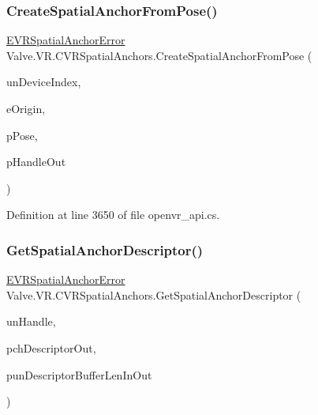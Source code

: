 \subsubsection{\texorpdfstring{CreateSpatialAnchorFromPose()}{CreateSpatialAnchorFromPose()}}
{\footnotesize\ttfamily \mbox{\hyperlink{namespace_valve_1_1_v_r_ab0aeb9b02c0851286deb0b4134b220d4}{E\+V\+R\+Spatial\+Anchor\+Error}} Valve.\+V\+R.\+C\+V\+R\+Spatial\+Anchors.\+Create\+Spatial\+Anchor\+From\+Pose (\begin{DoxyParamCaption}\item[{uint}]{un\+Device\+Index,  }\item[{\mbox{\hyperlink{namespace_valve_1_1_v_r_a29be99a3c2f780157bd490db06a7f12f}{E\+Tracking\+Universe\+Origin}}}]{e\+Origin,  }\item[{ref \mbox{\hyperlink{struct_valve_1_1_v_r_1_1_spatial_anchor_pose__t}{Spatial\+Anchor\+Pose\+\_\+t}}}]{p\+Pose,  }\item[{ref uint}]{p\+Handle\+Out }\end{DoxyParamCaption})}



Definition at line 3650 of file openvr\+\_\+api.\+cs.

\mbox{\label{class_valve_1_1_v_r_1_1_c_v_r_spatial_anchors_af010b477e2a6eb63b4a4c2a4258f3e87}} 
\subsubsection{\texorpdfstring{GetSpatialAnchorDescriptor()}{GetSpatialAnchorDescriptor()}}
{\footnotesize\ttfamily \mbox{\hyperlink{namespace_valve_1_1_v_r_ab0aeb9b02c0851286deb0b4134b220d4}{E\+V\+R\+Spatial\+Anchor\+Error}} Valve.\+V\+R.\+C\+V\+R\+Spatial\+Anchors.\+Get\+Spatial\+Anchor\+Descriptor (\begin{DoxyParamCaption}\item[{uint}]{un\+Handle,  }\item[{System.\+Text.\+String\+Builder}]{pch\+Descriptor\+Out,  }\item[{ref uint}]{pun\+Descriptor\+Buffer\+Len\+In\+Out }\end{DoxyParamCaption})}



